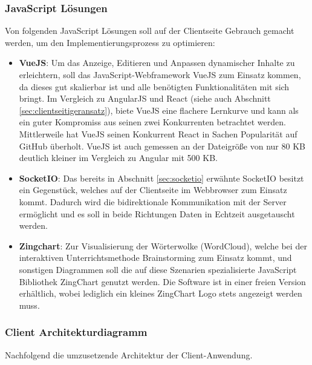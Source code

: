 \subsubsection{JavaScript Lösungen}\label{sec:clientjs}
Von folgenden JavaScript Lösungen soll auf der Clientseite Gebrauch gemacht werden, um den Implementierungsprozess zu optimieren:
\begin{itemize}
	\item \textbf{VueJS}: Um das Anzeige, Editieren und Anpassen dynamischer Inhalte zu erleichtern, soll das JavaScript-Webframework VueJS zum Einsatz kommen, da dieses gut skalierbar ist und alle benötigten Funktionalitäten mit sich bringt. Im Vergleich zu AngularJS und React (siehe auch Abschnitt \ref{sec:clientseitigeransatz}), biete VueJS eine flachere Lernkurve und kann als ein guter Kompromiss aus seinen zwei Konkurrenten betrachtet werden. Mittlerweile hat VueJS seinen Konkurrent React in Sachen Popularität auf GitHub überholt\cite{Daityari2019}. VueJS ist auch gemessen an der Dateigröße von nur 80 KB deutlich kleiner im Vergleich zu Angular mit 500 KB.
	\item \textbf{SocketIO}: Das bereits in Abschnitt \ref{sec:socketio} erwähnte SocketIO besitzt ein Gegenstück, welches auf der Clientseite im Webbrowser zum Einsatz kommt. Dadurch wird die bidirektionale Kommunikation mit der Server ermöglicht und es soll in beide Richtungen Daten in Echtzeit ausgetauscht werden. 
	\item \textbf{Zingchart}: Zur Visualisierung der Wörterwolke (WordCloud), welche bei der interaktiven Unterrichtsmethode Brainstorming zum Einsatz kommt, und sonstigen Diagrammen soll die auf diese Szenarien spezialisierte JavaScript Bibliothek ZingChart genutzt werden. Die Software ist in einer freien Version erhältlich, wobei lediglich ein kleines ZingChart Logo stets angezeigt werden muss\cite{zingchartpricing}.
\end{itemize}

\subsubsection{Client Architekturdiagramm}\label{sec:serverarchitekt}
Nachfolgend die umzusetzende Architektur der Client-Anwendung. 

